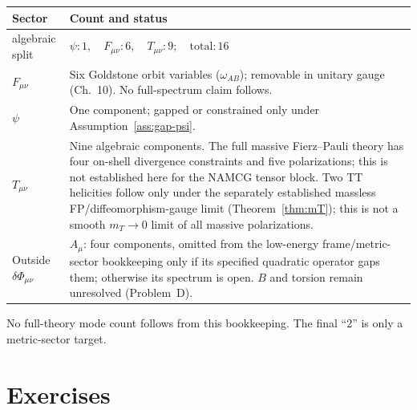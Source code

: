 \begin{center}
\begin{tabular}{@{}p{}p{}@{}}
\toprule
Sector & Count and status \\
\midrule
algebraic split & \(\psi:1,\quad F_{\mu\nu}:6,\quad
T_{\mu\nu}:9;\quad\text{total}:16\) \\
\(F_{\mu\nu}\) & Six Goldstone orbit variables
(\(\omega_{AB}\)); removable in unitary gauge (Ch.~10).
No full-spectrum claim follows. \\
\(\psi\) & One component; gapped or constrained only under
Assumption~\ref{ass:gap-psi}. \\
\(T_{\mu\nu}\) & Nine algebraic components. The full massive
Fierz--Pauli theory has four on-shell divergence constraints and five
polarizations; this is not established here for the NAMCG tensor
block. Two TT helicities follow only under the separately established
massless FP/diffeomorphism-gauge limit
(Theorem~\ref{thm:mT}); this is not a smooth
\(m_T\to0\) limit of all massive polarizations. \\
Outside \(\delta\Phi_{\mu\nu}\) & \(A_\mu\): four components, omitted
from the low-energy frame/metric-sector bookkeeping only if its
specified quadratic operator gaps them; otherwise its spectrum is
open. \(B\) and torsion remain unresolved (Problem~D). \\
\bottomrule
\end{tabular}
\end{center}

No full-theory mode count follows from this bookkeeping. The final
“2” is only a metric-sector target.

\section{Exercises}
\label{sec:ch5-exercises}

